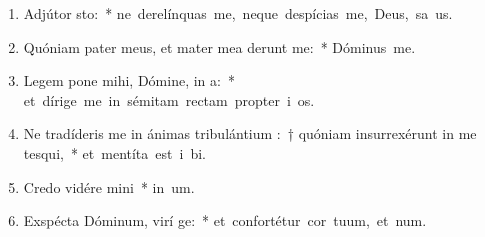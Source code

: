 \begin{flushleft}
\begin{enumerate}[leftmargin=*]
\item Adjútor  sto:~* \mbox{ne derelínquas me, neque despícias me, Deus, sa us.}
\item Quóniam pater meus, et mater mea derunt me:~* \mbox{Dóminus   me.}
\item Legem pone mihi, Dómine, in  a:~* \mbox{et dírige me in sémitam rectam propter i os.}
\item Ne tradíderis me in ánimas tribulántium :~† quóniam insurrexérunt in me tesqui,~* \mbox{et mentíta est i bi.}
\item Credo vidére  mini~* \mbox{in  um.}
\item Exspécta Dóminum, virí ge:~* \mbox{et confortétur cor tuum, et  num.}


\end{enumerate}
\end{flushleft}

